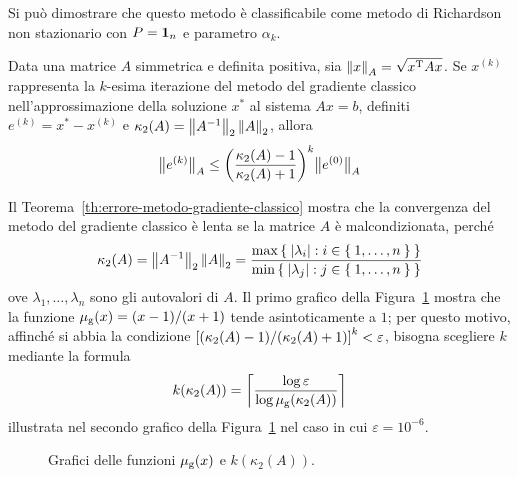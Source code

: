 	Si può dimostrare che questo metodo è classificabile come metodo di Richardson non stazionario con \(P = \mathbf{1}_n\) e parametro \(\alpha_k\).
	
	\begin{teorema}\label{th:errore-metodo-gradiente-classico}
		Data una matrice \(A\) simmetrica e definita positiva, sia \(\norm{x}_A = \sqrt{x^\mathrm{T}\relax A x}\). Se \(x^{(k)}\) rappresenta la \(k\)-esima iterazione del metodo del gradiente classico nell'approssimazione della soluzione \(x^*\) al sistema \(A x = b\), definiti \(e^{(k)} = x^* - x^{(k)}\) e \(\kappa_2 (A) = \norm{A^{-1}}_2 \, \norm{A}_2\), allora
		\begin{equation}\label{eq:errore-metodo-gradiente-classico}
			\bigl\| e^{(k)} \bigr\|_A \le \qty(\frac{\kappa_2 (A) - 1}{\kappa_2 (A) + 1})^k \bigl\| e^{(0)} \bigr\|_A
		\end{equation}
	\end{teorema}

	\begin{osservazione}
		Il Teorema~\ref{th:errore-metodo-gradiente-classico} mostra che la convergenza del metodo del gradiente classico è lenta se la matrice \(A\) è malcondizionata, perché
		\begin{equation*}
			\kappa_2 (A) = \norm{A^{-1}}_2 \, \norm{A}_2 = \frac{\max \Set{\abs{\lambda_i} : i \in \Set{1, \dots, n}}}{\min \Set{\abs{\lambda_j} : j \in \Set{1, \dots, n}}}
		\end{equation*}
		ove \(\lambda_1, \dots, \lambda_n\) sono gli autovalori di \(A\). Il primo grafico della Figura~\ref{fig:condiz-grad-classico} mostra che la funzione \(\mu_\textup{g} (x) = (x - 1) / (x + 1)\) tende asintoticamente a \(1\); per questo motivo, affinché si abbia la condizione \(\qty[(\kappa_2 (A) - 1) / (\kappa_2 (A) + 1)]^k < \varepsilon\), bisogna scegliere \(k\) mediante la formula
		\begin{equation*}
			k (\kappa_2 (A)) = \left\lceil \frac{\log \varepsilon}{\log \mu_\textup{g} (\kappa_2 (A))} \right\rceil
		\end{equation*}
		illustrata nel secondo grafico della Figura~\ref{fig:condiz-grad-classico} nel caso in cui \(\varepsilon = 10^{-6}\).
		
		\begin{figure}[tpb]
			\centering
			\caption{Grafici delle funzioni \(\mu_\textup{g} (x)\) e \(k (\kappa_2 (A))\).}\label{fig:condiz-grad-classico}
		\end{figure}
	\end{osservazione}

